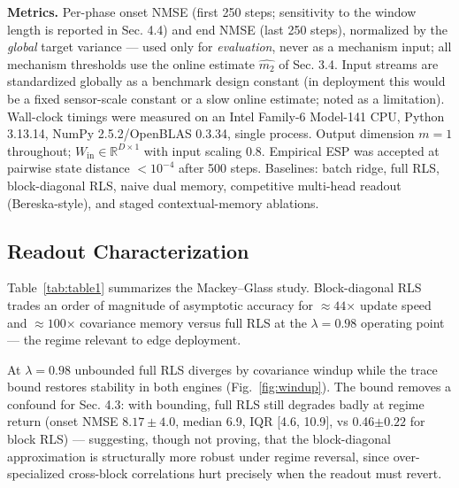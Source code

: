 \documentclass[11pt]{article}
\begin{document}
\textbf{Metrics.} Per-phase onset NMSE (first 250 steps; sensitivity to the
window length is reported in Sec. 4.4) and end NMSE (last 250 steps),
normalized by the \emph{global} target variance --- used only for
\emph{evaluation}, never as a mechanism input; all mechanism thresholds use
the online estimate \(\widehat{m_2}\) of Sec. 3.4. Input streams are
standardized globally as a benchmark design constant (in deployment
this would be a fixed sensor-scale constant or a slow online estimate;
noted as a limitation). Wall-clock timings were measured on an Intel
Family-6 Model-141 CPU, Python 3.13.14, NumPy 2.5.2/OpenBLAS 0.3.34,
single process. Output dimension \(m=1\) throughout; \(W_{\mathrm{in}}
\in\mathbb{R}^{D\times1}\) with input scaling 0.8. Empirical ESP was
accepted at pairwise state distance \(<10^{-4}\) after 500 steps.
Baselines: batch ridge, full RLS, block-diagonal RLS, naive dual
memory, competitive multi-head readout (Bereska-style), and staged
contextual-memory ablations.

\subsection{Readout Characterization}\label{readout-characterization}

Table~\ref{tab:table1} summarizes the Mackey--Glass study. Block-diagonal RLS
trades an order of magnitude of asymptotic accuracy for
\(\approx 44\)× update speed and \(\approx 100\)× covariance memory
versus full RLS at the \(\lambda{=}0.98\) operating point ---
the regime relevant to edge deployment.

\begin{table}[t]
\centering\small
\caption{Readout characterization on MG-17 ($D{=}100$, $K{=}10$,
$F{=}1001$). $\lambda{=}1$ NMSEs are representative values from the
10-seed characterization; $\lambda{=}0.98$ rows are single-seed
diagnostics at the operating point used throughout. Accuracy gap
$\approx14\times$, speed gap $\approx44\times$ at that point --- the
faster 53 \textmu s/step figure at $\lambda{=}1$ is \emph{not} the
configuration used in this paper (the bound adds $\approx 30$
\textmu s).}
\label{tab:table1}

\end{table}

At \(\lambda=0.98\) unbounded full RLS diverges by
covariance windup while the trace bound restores stability in both
engines (Fig.~\ref{fig:windup}). The bound removes a confound for Sec. 4.3: with
bounding, full RLS still degrades badly at regime return (onset NMSE
\(8.17\pm4.0\), median 6.9, IQR {[}4.6, 10.9{]}, vs 0.46\(\pm0.22\) for block
RLS) --- suggesting, though not proving, that the block-diagonal
approximation is structurally more robust under regime reversal, since
over-specialized cross-block correlations hurt precisely when the
readout must revert.
\end{document}
